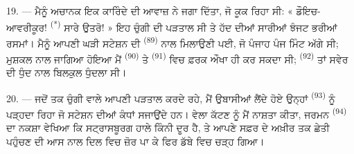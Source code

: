 \VUsaut{3.0mm}
\VUsaut{3.0mm}

19. --- ਮੈਨੂੰ ਅਚਾਨਕ ਇਕ ਕਾਰਿੰਦੇ ਦੀ ਆਵਾਜ਼ ਨੇ ਜਗਾ ਦਿੱਤਾ, ਜੋ ਕੂਕ ਰਿਹਾ ਸੀ:
« ਡੌਇਚ-ਆਵਰੀਕੂਰ! \textsuperscript{(*)} ਸਾਰੇ ਉਤਰੋ! » ਇਹ ਚੁੰਗੀ ਦੀ ਪੜਤਾਲ ਸੀ ਤੇ ਹੱਦ
ਦੀਆਂ ਸਾਰੀਆਂ ਝੰਜਟ ਭਰੀਆਂ ਰਸਮਾਂ। ਮੈਨੂੰ ਆਪਣੀ ਘੜੀ ਸਟੇਸ਼ਨ ਦੀ 
\textsuperscript{(89)} ਨਾਲ ਮਿਲਾਉਣੀ ਪਈ, ਜੋ ਪੰਜਾਹ ਪੰਜ ਮਿੰਟ ਅੱਗੇ ਸੀ; ਮੁਸ਼ਕਲ ਨਾਲ ਜਾਗਿਆ
ਹੋਇਆ ਮੈਂ  \textsuperscript{(90)} ਤੇ 
\textsuperscript{(91)} ਵਿਚ ਫ਼ਰਕ ਔਖਾ ਹੀ ਕਰ ਸਕਦਾ ਸੀ; 
\textsuperscript{(92)} ਤਾਂ ਸਵੇਰ ਦੀ ਧੁੰਦ ਨਾਲ ਬਿਲਕੁਲ ਧੁੰਦਲਾ ਸੀ।

20. --- ਜਦੋਂ ਤਕ ਚੁੰਗੀ ਵਾਲੇ ਆਪਣੀ ਪੜਤਾਲ ਕਰਦੇ ਰਹੇ, ਮੈਂ ਉਬਾਸੀਆਂ ਲੈਂਦੇ ਹੋਏ ਉਨ੍ਹਾਂ
 \textsuperscript{(93)} ਨੂੰ ਪੜ੍ਹਦਾ ਰਿਹਾ ਜੋ ਸਟੇਸ਼ਨ ਦੀਆਂ ਕੰਧਾਂ
ਸਜਾਉਂਦੇ ਹਨ। ਵੇਲਾ ਕੱਟਣ ਨੂੰ ਮੈਂ ਨਾਸ਼ਤਾ ਕੀਤਾ, ਜਰਮਨ  \textsuperscript{(94)}
ਦਾ ਨਕਸ਼ਾ ਵੇਖਿਆ ਕਿ ਸਟ੍ਰਾਸਬੂਰਗ ਹਾਲੇ ਕਿੰਨੀ ਦੂਰ ਹੈ, ਤੇ ਆਪਣੇ ਸਫ਼ਰ ਦੇ ਅਖ਼ੀਰ ਤਕ ਛੇਤੀ
ਪਹੁੰਚਣ ਦੀ ਆਸ ਨਾਲ ਦਿਲ ਵਿਚ ਜ਼ੋਰ ਪਾ ਕੇ ਫਿਰ ਡੱਬੇ ਵਿਚ ਚੜ੍ਹ ਗਿਆ।
\VUsaut{6.0mm}
\VUfilet{22mm}
